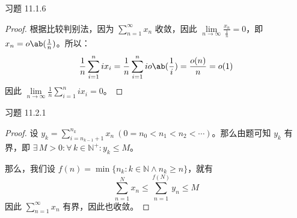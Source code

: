 \begin{problem}
    习题 11.1.6
    \begin{proof}
        根据比较判别法，因为 $\sum\limits_{n = 1}^{\infty} x_n$ 收敛，因此 $\lim\limits_{n \to \infty} \frac{x_n}{\frac{1}{n}} = 0$，即 $x_n = o\ab(\frac{1}{n})$。所以：
        $$
        \frac{1}{n} \sum_{i = 1}^{n} i x_i = \frac{1}{n} \sum_{i = 1}^{n} i o\ab(\frac{1}{i}) = \frac{o(n)}{n} = o(1)
        $$
        因此 $\lim\limits_{n \to \infty} \frac{1}{n} \sum\limits_{i = 1}^n i x_i = 0$。
    \end{proof}
\end{problem}

\begin{problem}
    习题 11.2.1
    \begin{proof}
        设 $y_k = \sum\limits_{i = n_{k - 1} + 1}^{n_k} x_n\ (0 = n_0 < n_1 < n_2 < \cdots)$。那么由题可知 $y_k$ 有界，即 $\exists\,M > 0: \forall\,k \in \mathbb{N}^{+}: y_k \le M$。

        那么，我们设 $f(n) = \min\{n_k: k \in \mathbb{N} \land n_k \ge n\}$，就有
        $$
        \sum_{n = 1}^N x_n \le \sum_{n = 1}^{f(N)} y_n \le M
        $$
        因此 $\sum\limits_{n = 1}^{\infty} x_n$ 有界，因此也收敛。
    \end{proof}
\end{problem}

